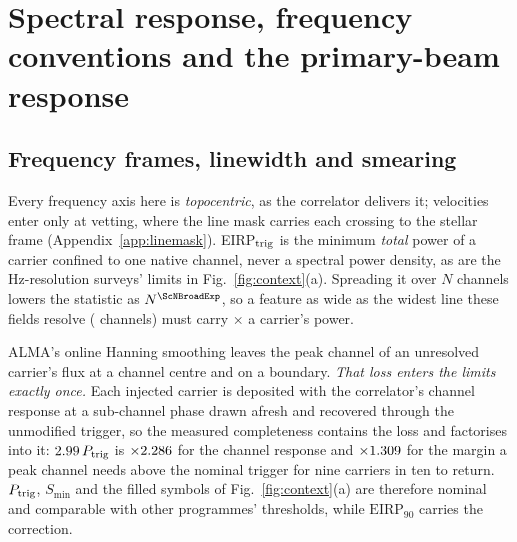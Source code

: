 \section{Spectral response, frequency conventions and the primary-beam
response}
\label{app:conventions}


\subsection{Frequency frames, linewidth and smearing}

Every frequency axis here is \emph{topocentric}, as the correlator delivers
it; velocities enter only at vetting, where the line mask carries each
crossing to the stellar frame (Appendix~\ref{app:linemask}). EIRP$_{\rm trig}$
is the minimum \emph{total} power of a carrier confined to one native channel,
never a spectral power density, as are the Hz-resolution surveys' limits in
Fig.~\ref{fig:context}(a). Spreading it over $N$ channels lowers the statistic as
$N^{\ScNBroadExp}$, so a feature as wide as the widest line these fields
resolve (\ScNBroadChan{} channels) must carry \ScNBroadRatio$\times$ a
carrier's power.

ALMA's online Hanning smoothing \citep{ALMAHandbook} leaves the peak channel
\HanBest{} of an unresolved carrier's flux at a channel centre and \HanWorst{}
on a boundary. \emph{That loss enters the limits exactly once.} Each injected
carrier is deposited with the correlator's channel response at a sub-channel
phase drawn afresh and recovered through the unmodified trigger, so the
measured completeness contains the loss and factorises into it:
$2.99\,P_{\rm trig}$ is $\times2.286$ for the channel response
and $\times1.309$ for the margin a peak channel needs above the
nominal trigger for nine carriers in ten to return. $P_{\rm trig}$, $S_{\min}$
and the filled symbols of Fig.~\ref{fig:context}(a) are therefore nominal and
comparable with other programmes' thresholds, while $\mathrm{EIRP}_{90}$
carries the correction.

